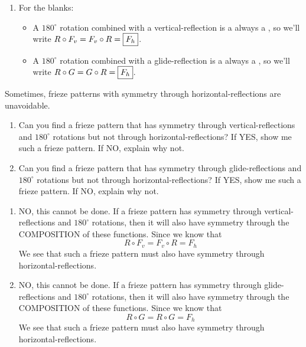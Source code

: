 \documentclass[noauthor,nooutcomes,hints        ]{ximera}
\begin{document}
\begin{question}
\begin{freeResponse}
\begin{enumerate}
\begin{center}
      \end{center}
    \item For the blanks:
      \begin{itemize}
      \item  A $180^\circ$ rotation combined with a vertical-reflection
        is a always a , so we'll
        write $R\circ F_v = F_v \circ R = \fbox{$F_h$}$.
      \item A $180^\circ$ rotation combined with a glide-reflection
        is a always a , so we'll
        write $R\circ G = G \circ R = \fbox{$F_h$}$.
      \end{itemize}
    \end{enumerate}
  \end{freeResponse}
\end{question}
\mynewpage








\begin{question}
  Sometimes, frieze patterns with symmetry through
  horizontal-reflections are unavoidable.
  \begin{enumerate}
  \item Can you find a frieze pattern that has symmetry through
    vertical-reflections and $180^\circ$ rotations but not through
    horizontal-reflections? If YES, show me such a frieze pattern. If
    NO, explain why not.    
  \item
    Can you find a frieze pattern that has symmetry through
    glide-reflections and $180^\circ$ rotations but not through
    horizontal-reflections? If YES, show me such a frieze pattern. If
    NO, explain why not.
  \end{enumerate}
  \begin{freeResponse}
    \begin{enumerate}
    \item NO, this cannot be done. If a frieze pattern has symmetry
      through vertical-reflections and $180^\circ$ rotations, then it
      will also have symmetry through the COMPOSITION of these
      functions. Since we know that
      \[
      R\circ F_v = F_v \circ R = F_h
      \]
      We see that such a frieze pattern must also have symmetry
      through horizontal-reflections.
    \item NO, this cannot be done.  If a frieze pattern has symmetry
      through glide-reflections and $180^\circ$ rotations, then it
      will also have symmetry through the COMPOSITION of these
      functions. Since we know that
      \[
      R\circ G = R\circ G = F_h
      \]
      We see that such a frieze pattern must also have symmetry
      through horizontal-reflections.
    \end{enumerate}
  \end{freeResponse}
\end{question}
\end{document}
